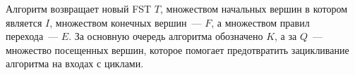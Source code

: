 Алгоритм возвращает новый FST $T$, множеством начальных вершин в котором является $I$, множеством конечных вершин~--- $F$, а множеством правил перехода~--- $E$. За основную очередь алгоритма обозначено $K$, а за $Q$~--- множество посещенных вершин, которое помогает предотвратить зацикливание алгоритма на входах с циклами.


